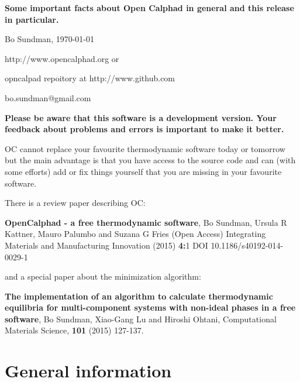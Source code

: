 \documentclass[12pt]{article}
\begin{document}
\begin{center}
{\Large \bf Some important facts about Open Calphad in general and
  this release in particular.

}

Bo Sundman, \today

http://www.opencalphad.org or

opncalpad repoitory at http://www.github.com

bo.sundman@gmail.com
\end{center}

{\large \bf Please be aware that this software is a development
  version.  Your feedback about problems and errors is important to
  make it better.

}

OC cannot replace your favourite thermodynamic software today or
tomorrow but the main advantage is that you have access to the source
code and can (with some efforts) add or fix things yourself that you
are missing in your favourite software.

There is a review paper describing OC:

{\bf OpenCalphad - a free thermodynamic software}, Bo Sundman, Ursula
R Kattner, Mauro Palumbo and Suzana G Fries (Open Access) Integrating
Materials and Manufacturing Innovation (2015) {\bf 4:}1 DOI
10.1186/s40192-014-0029-1

and a special paper about the minimization algorithm:

{\bf The implementation of an algorithm to calculate thermodynamic
  equilibria for multi-component systems with non-ideal phases in a
  free software}, Bo Sundman, Xiao-Gang Lu and Hiroshi Ohtani,
Computational Materials Science, {\bf 101} (2015) 127-137.

\section{General information}
\end{document}
